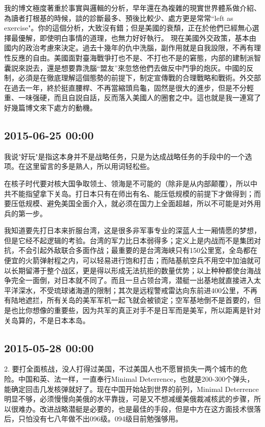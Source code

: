 \documentclass[twocolumn]{ctexart}
\begin{document}
我的博文極度著重於事實與邏輯的分析，早年還在為複雜的現實世界體系做介紹、為讀者打根基的時候，談的診斷最多、預後比較少、處方更是常常“left as exercise"。你的這個分析，大致沒有錯；但是美國的衰頹，正在於他們已經無心選擇最優解，即使明白事情的道理，也無力好好執行。
現在美國外交政策，基本由國内的政治考慮來決定。過去十幾年的仇中洗腦，副作用就是自我設限，不再有理性反應的自由。美國面對臺海戰爭打也不是、不打也不是的窘態，内部的建制派智囊説來説去，還是想要靠洗腦“盟友”來忽悠他們去做反中鬥爭的炮灰。中國的反制，必須是在徹底理解這個態勢的前提下，制定宣傳戰的合理戰略和戰術。外交部在過去一年，終於挺直腰桿、不再當縮頭烏龜，固然是很大的進步，但是不分輕重、一味强硬，而且自説自話，反而落入美國人的圈套之中。這也就是我一連寫了好幾篇博文來下處方的動機。
\subsection*{2015-06-25 00:00}
我说"好玩"是指这本身并不是战略任务，只是为达成战略任务的手段中的一个选项。在这里留言的多是熟人，所以用词轻松些。

在核子时代要对核大国争取领土、领海是不可能的（除非是从内部颠覆），所以中共不能指望拿下关岛。打日本只有在师出有名、能压低规模的前提下才做得到；而要压低规模、避免美国全面介入，就必须在国力上全面超越，所以不可能是对外用兵的第一步。

我知道要先打日本来折服台湾，这是很多非军事专业的深蓝人士一厢情愿的梦想，但是它经不起逻辑的考验。台湾的军力比日本弱得多；定义上是内战而不是集团对抗，不会引起外敌联合多面作战；最重要的是台湾海峡只有150公里宽，全岛都在便宜的火箭弹射程之内，可以轻易进行饱和打击；而陆基航空兵不用空中加油就可以长期留滞于整个战区，更是得以形成无法抗拒的数量优势；以上种种都使台海战争完全一面倒，对日本就不同了。而且一旦占领台湾，潜艇一出基地就直接进入太平洋深水，不受琉球诸海道的限制；其次是远程警戒雷达向东前进400公里，不再有陆地遮拦，所有关岛的美军军机一起飞就会被锁定；空军基地倒不是首要的，但是也比你想像的重要些，因为共军的真正对手不是日军而是美军，所以距离是针对关岛算的，不是日本本岛。

\subsection*{2015-05-28 00:00}
2. 要打全面核战，没人打得过美国，不过美国人也不愿冒损失一两个城市的危险。中国和英、法一样，一直奉行Minimal Deterrence，也就是200-300个弹头，能确定回击几发核弹就好了。现在中国开始站到世界的前列，Minimal Deterrence明显不够，必须慢慢向美俄的水平靠拢，可是又不想减缓美俄裁减核武的步骤，所以很难办。改进战略潜艇是必要的，也是最佳的手段，但是中方在这方面技术很落后，只怕没有七八年做不出096级。094级目前勉强够用。
\end{document}
